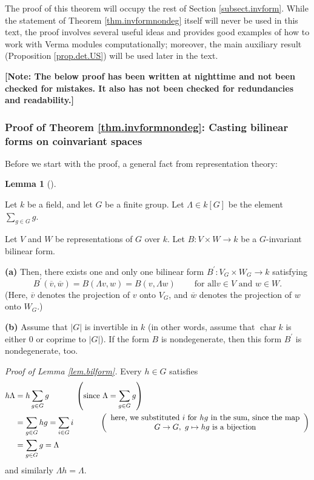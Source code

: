 \documentclass
[numbers=enddot,12pt,final,onecolumn,german,notitlepage]{scrartcl}%
\theoremstyle{definition}
\newtheorem{lem}[theo]{Lemma}
\newenvironment{lemma}[1][]
{\begin{lem}[#1]\begin{leftbar}}
{\end{leftbar}\end{lem}}
\begin{document}
The proof of this theorem will occupy the rest of Section
\ref{subsect.invform}. While the statement of Theorem \ref{thm.invformnondeg}
itself will never be used in this text, the proof involves several useful
ideas and provides good examples of how to work with Verma modules
computationally; moreover, the main auxiliary result (Proposition
\ref{prop.det.US}) will be used later in the text.

\textbf{[Note: The below proof has been written at nighttime and not been
checked for mistakes. It also has not been checked for redundancies and
readability.]}

\subsubsection{Proof of Theorem \ref{thm.invformnondeg}: Casting bilinear
forms on coinvariant spaces}

Before we start with the proof, a general fact from representation theory:

\begin{lemma}
\label{lem.bilform}Let $k$ be a field, and let $G$ be a finite group. Let
$\Lambda\in k\left[  G\right]  $ be the element $\sum\limits_{g\in G}g$.

Let $V$ and $W$ be representations of $G$ over $k$. Let $B:V\times
W\rightarrow k$ be a $G$-invariant bilinear form.

\textbf{(a)} Then, there exists one and only one bilinear form $B^{\prime
}:V_{G}\times W_{G}\rightarrow k$ satisfying%
\[
B^{\prime}\left(  \overline{v},\overline{w}\right)  =B\left(  \Lambda
v,w\right)  =B\left(  v,\Lambda w\right)  \ \ \ \ \ \ \ \ \ \ \text{for all
}v\in V\text{ and }w\in W\text{.}%
\]
(Here, $\overline{v}$ denotes the projection of $v$ onto $V_{G}$, and
$\overline{w}$ denotes the projection of $w$ onto $W_{G}$.)

\textbf{(b)} Assume that $\left\vert G\right\vert $ is invertible in $k$ (in
other words, assume that $\operatorname*{char}k$ is either $0$ or coprime to
$\left\vert G\right\vert $). If the form $B$ is nondegenerate, then this form
$B^{\prime}$ is nondegenerate, too.
\end{lemma}

\textit{Proof of Lemma \ref{lem.bilform}.} Every $h\in G$ satisfies%
\begin{align*}
h\Lambda &  =h\sum\limits_{g\in G}g\ \ \ \ \ \ \ \ \ \ \left(  \text{since
}\Lambda=\sum\limits_{g\in G}g\right) \\
&  =\sum\limits_{g\in G}hg=\sum\limits_{i\in G}i\ \ \ \ \ \ \ \ \ \ \left(
\begin{array}
[c]{c}%
\text{here, we substituted }i\text{ for }hg\text{ in the sum, since the map}\\
G\rightarrow G,\ g\mapsto hg\text{ is a bijection}%
\end{array}
\right) \\
&  =\sum\limits_{g\in G}g=\Lambda
\end{align*}
and similarly $\Lambda h=\Lambda$.
\end{document}
